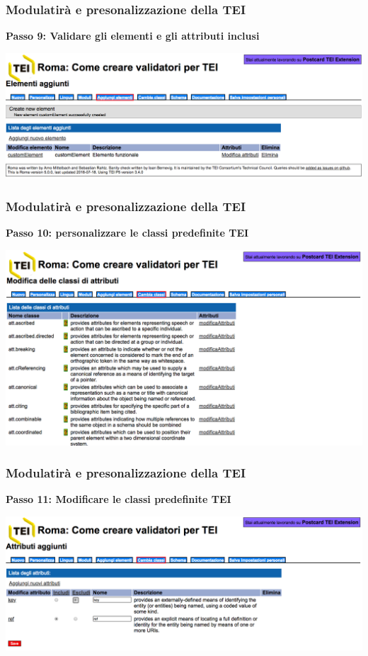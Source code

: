 \begin{frame}
    \frametitle{Modulatirà e presonalizzazione della TEI}
    \addtocounter{nframe}{1}

    \textbf{Passo 9: Validare gli elementi e gli attributi inclusi}

     \begin{center}
        \includegraphics[width=.9\textwidth]{imgs/Roma8.png}
     \end{center}
   
    
\end{frame}


\begin{frame}
    \frametitle{Modulatirà e presonalizzazione della TEI}
    \addtocounter{nframe}{1}
    
    \textbf{Passo 10: personalizzare le classi predefinite TEI }

     \begin{center}
        \includegraphics[width=.9\textwidth]{imgs/Roma10.png}
     \end{center}
   
    
\end{frame}

\begin{frame}
    \frametitle{Modulatirà e presonalizzazione della TEI}
    \addtocounter{nframe}{1}
    
    \textbf{Passo 11: Modificare le classi predefinite TEI}

     \begin{center}
        \includegraphics[width=.9\textwidth]{imgs/Roma11.png}
     \end{center}
   
    
\end{frame}

